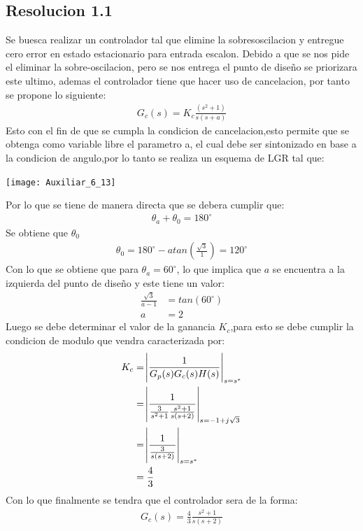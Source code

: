 \documentclass[
  11pt,
  letterpaper,
   addpoints,
   answers
  ]{exam}
\begin{document}
\begin{questions}
\begin{solution}
    \subsection*{Resolucion 1.1}
    Se buesca realizar un controlador tal que elimine la sobresoscilacion y entregue cero error en estado estacionario para entrada escalon. Debido a que se nos pide el eliminar la sobre-oscilacion, pero se nos entrega el punto de diseño se priorizara este ultimo, ademas el controlador tiene que hacer uso de cancelacion, por tanto se propone lo siguiente:
    \begin{align}
        G_{c}(s)= K_{c}\frac{(s^{2}+1)}{s(s+a)}
    \end{align}
    Esto con el fin de que se cumpla la condicion de cancelacion,esto permite que se obtenga como variable libre el parametro a, el cual debe ser sintonizado en base a la condicion de angulo,por lo tanto se realiza un esquema de LGR tal que:
    \begin{center}
        \texttt{[image: Auxiliar\_6\_13]}
    \end{center}
    Por lo que se tiene de manera directa que se debera cumplir que:
    \begin{align}
        \theta_{a} + \theta_{0} = 180^{\circ} 
    \end{align}
    Se obtiene que $\theta_{0}$
    \begin{align}
        \theta_{0} = 180^{\circ}- atan\left(\frac{\sqrt{3}}{1}\right) = 120^{\circ}
    \end{align}
    Con lo que se obtiene que para $\theta_{a}=60^{\circ}$, lo que implica que $a$ se encuentra a la izquierda del punto de diseño y este tiene un valor:
    \begin{align}
        \frac{\sqrt{3}}{a-1}&= tan(60^{\circ})\\
        a&= 2
    \end{align}
    Luego se debe determinar el valor de la ganancia $K_{c}$,para esto se debe cumplir la condicion de modulo que vendra caracterizada por:
    \begin{align}
        K_{c} &= \abs{\frac{1}{G_{p}(s)G_{c}(s)H(s)}}_{s=s^{*}}\\
              &= \abs{\frac{1}{\frac{3}{s^{2}+1}\frac{s^{2}+1}{s(s+2)}}}_{s=-1+j\sqrt{3}}\\
              &= \abs{\frac{1}{\frac{3}{s(s+2)}}}_{s=s^{*}}\\\
              &= \frac{4}{3}
    \end{align}
    Con lo que finalmente se tendra que el controlador sera de la forma:
    \begin{align}
        G_{c}(s) = \frac{4}{3}\frac{s^{2}+1}{s(s+2)}
    \end{align}

\end{solution}
\end{questions}
\end{document}
